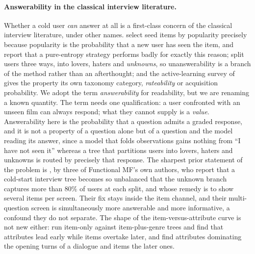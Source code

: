 \documentclass[acmsmall,review,anonymous]{acmart}
\begin{document}
\paragraph{Answerability in the classical interview literature.}\label{sec:answerability} Whether a cold user \emph{can} answer at all is a first-class concern of the classical interview literature, under other names. \citet{rashid2002getting} select seed items by popularity precisely because popularity is the probability that a new user has seen the item, and report that a pure-entropy strategy performs badly for exactly this reason; \citet{golbandi2011adaptive} split users three ways, into lovers, haters and \emph{unknowns}, so unanswerability is a branch of the method rather than an afterthought; and the active-learning survey of \citet{elahi2016survey} gives the property its own taxonomy category, \emph{rateability} or acquisition probability. We adopt the term \emph{answerability} for readability, but we are renaming a known quantity. The term needs one qualification: a user confronted with an unseen film can always respond; what they cannot supply is a \emph{value}. Answerability here is the probability that a question admits a graded response, and it is not a property of a question alone but of a question and the model reading its answer, since a model that folds observations gains nothing from ``I have not seen it'' whereas a tree that partitions users into lovers, haters and unknowns is routed by precisely that response. The sharpest prior statement of the problem is \citet{sun2013learning}, by three of Functional MF's own authors, who report that a cold-start interview tree becomes so unbalanced that the unknown branch captures more than $80\%$ of users at each split, and whose remedy is to show several items per screen. Their fix stays inside the item channel, and their multi-question screen is simultaneously more answerable and more informative, a confound they do not separate. The shape of the item-versus-attribute curve is not new either: \citet{gharahighehi2025pairwise} run item-only against item-plus-genre trees and find that attributes lead early while items overtake later, and \citet{xia2026when} find attributes dominating the opening turns of a dialogue and items the later ones.
\end{document}
